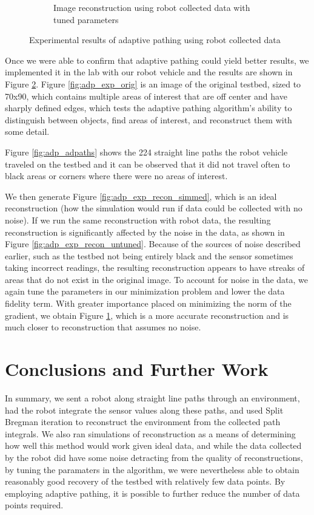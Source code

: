 \documentclass[english]{article}\usepackage[]{graphicx}\usepackage[]{color}
\begin{document}
\begin{figure}[H]
\begin{subfigure}{.3\textwidth}
  \caption{Image reconstruction using robot collected data with tuned parameters}
  \vspace{0pt}
  \label{fig:adp_exp_recon_tuned}
\end{subfigure}
\caption{Experimental results of adaptive pathing using robot collected data}
\label{fig:adp_exp_fig}
\end{figure}
Once we were able to confirm that adaptive pathing could yield better results, we implemented it in the lab with our robot vehicle and the results are shown in Figure \ref{fig:adp_exp_fig}. Figure \ref{fig:adp_exp_orig} is an image of the original testbed, sized to 70x90, which contains multiple areas of interest that are off center and have sharply defined edges, which tests the adaptive pathing algorithm's ability to distinguish between objects, find areas of interest, and reconstruct them with some detail. 

Figure \ref{fig:adp_adpaths} shows the 224 straight line paths the robot vehicle traveled on the testbed and it can be observed that it did not travel often to black areas or corners where there were no areas of interest.

We then generate Figure \ref{fig:adp_exp_recon_simmed}, which is an ideal reconstruction (how the simulation would run if data could be collected with no noise). If we run the same reconstruction with robot data, the resulting reconstruction is significantly affected by the noise in the data, as shown in Figure \ref{fig:adp_exp_recon_untuned}. Because of the sources of noise described earlier, such as the testbed not being entirely black and the sensor sometimes taking incorrect readings, the resulting reconstruction appears to have streaks of areas that do not exist in the original image. To account for noise in the data, we again tune the parameters in our minimization problem and lower the data fidelity term. With greater importance placed on minimizing the norm of the gradient, we obtain Figure \ref{fig:adp_exp_recon_tuned}, which is a more accurate reconstruction and is much closer to reconstruction that assumes no noise.


\section{Conclusions and Further Work}

In summary, we sent a robot along straight line paths through an environment, had the robot integrate the sensor values along these paths, and used Split Bregman iteration to reconstruct the environment from the collected path integrals. We also ran simulations of reconstruction as a means of determining how well this method would work given ideal data, and while the data collected by the robot did have some noise detracting from the quality of reconstructions, by tuning the paramaters in the algorithm, we were nevertheless able to obtain reasonably good recovery of the testbed with relatively few data points. By employing adaptive pathing, it is possible to further reduce the number of data points required.
\end{document}
